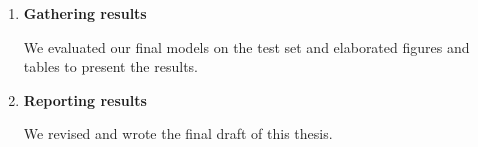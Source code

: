 \begin{enumerate}
\begin{comment}
	\item \textbf{Alternative convolutional networks}

We will train a linear classifier, probably rectified linear units, on the features obtained from a convolutional network trained on the ImageNet database, i.e., we will use an already trained convolutional network instead of one trained specifically in mammograms. We will also use an all convolutional network of a size relative to the best arhcitecture up to that point. We want to answer two questions: can we use an already trained convolutional network to classify mammograms and do using an all convolutional network affects significatively the results?
\end{comment}

	\item \textbf{Gathering results}

We evaluated our final models on the test set and elaborated figures and tables to present the results.

	\item \textbf{Reporting results}
	
We revised and wrote the final draft of this thesis.
\end{enumerate}

